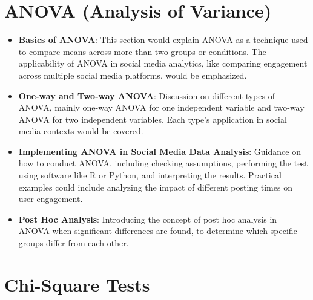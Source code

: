 \documentclass[
]{book}
\providecommand{\tightlist}{%
  \setlength{\itemsep}{0pt}\setlength{\parskip}{0pt}}
\begin{document}
\hypertarget{anova-analysis-of-variance}{%
\section*{ANOVA (Analysis of Variance)}\label{anova-analysis-of-variance}}

\begin{itemize}
\tightlist
\item
  \textbf{Basics of ANOVA}: This section would explain ANOVA as a technique used to compare means across more than two groups or conditions. The applicability of ANOVA in social media analytics, like comparing engagement across multiple social media platforms, would be emphasized.
\item
  \textbf{One-way and Two-way ANOVA}: Discussion on different types of ANOVA, mainly one-way ANOVA for one independent variable and two-way ANOVA for two independent variables. Each type's application in social media contexts would be covered.
\item
  \textbf{Implementing ANOVA in Social Media Data Analysis}: Guidance on how to conduct ANOVA, including checking assumptions, performing the test using software like R or Python, and interpreting the results. Practical examples could include analyzing the impact of different posting times on user engagement.
\item
  \textbf{Post Hoc Analysis}: Introducing the concept of post hoc analysis in ANOVA when significant differences are found, to determine which specific groups differ from each other.
\end{itemize}

\hypertarget{chi-square-tests}{%
\section*{Chi-Square Tests}\label{chi-square-tests}}
\end{document}
